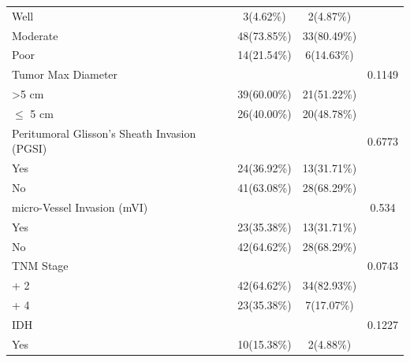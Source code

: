 \documentclass[num-refs]{wiley-article}
\begin{document}
\begin{table}[]
\begin{center}
\begin{tabular}{|l|c|c|c|}
\quad Well                                           & 3(4.62\%)    & 2(4.87\%)   &                         \\ \cline{1-3}
\quad Moderate                                       & 48(73.85\%)  & 33(80.49\%) &                         \\ \cline{1-3}
\quad Poor                                           & 14(21.54\%)  & 6(14.63\%)  &                         \\ \hline
Tumor Max   Diameter                           &              &             & 0.1149 \\ \cline{1-3}
\quad \textgreater{}5 cm                             & 39(60.00\%)  & 21(51.22\%) &                         \\ \cline{1-3}
\quad $\leq$ 5 cm                                       & 26(40.00\%)  & 20(48.78\%) &                         \\ \hline
Peritumoral   Glisson’s Sheath Invasion (PGSI) &              &             & 0.6773 \\ \cline{1-3}
\quad Yes                                            & 24(36.92\%)  & 13(31.71\%) &                         \\ \cline{1-3}
\quad No                                             & 41(63.08\%)  & 28(68.29\%) &                         \\ \hline
micro-Vessel   Invasion (mVI)                  &              &             & 0.534  \\ \cline{1-3}
\quad Yes                                            & 23(35.38\%)  & 13(31.71\%) &                         \\ \cline{1-3}
\quad No                                             & 42(64.62\%)  & 28(68.29\%) &                         \\ \hline
TNM Stage                                      &              &             & 0.0743 \\ \cline{1-3}
\quad 1 + 2                                          & 42(64.62\%)  & 34(82.93\%) &                         \\ \cline{1-3}
\quad 3 + 4                                          & 23(35.38\%)  & 7(17.07\%)  &                         \\ \hline
IDH                                            &              &             & 0.1227 \\ \cline{1-3}
\quad Yes                                            & 10(15.38\%)  & 2(4.88\%)   &                         \\ \cline{1-3}

\end{tabular}
\end{center}
\end{table}
\end{document}
